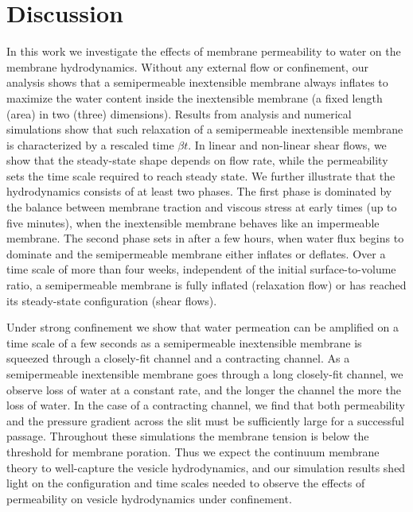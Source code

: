 \documentclass[prb,preprint,showpacs,preprintnumbers,amsmath,amssymb,longbibliography]{revtex4-1}
\begin{document}
\section{Discussion}
In this work we investigate the effects of membrane permeability to
water on the membrane hydrodynamics. Without any external flow or
confinement, our analysis shows that a semipermeable inextensible
membrane always inflates to maximize the water content inside the
inextensible membrane (a fixed length (area) in two (three) dimensions).
Results from analysis and numerical simulations show that such
relaxation of a semipermeable inextensible membrane is characterized by
a rescaled time $\beta t$. In linear and non-linear shear flows, we show
that the steady-state shape depends on flow rate, while the permeability
sets the time scale required to reach steady state. We further
illustrate that the hydrodynamics consists of at least two phases. The
first phase is dominated by the balance between membrane traction and
viscous stress at early times (up to five minutes), when the
inextensible membrane behaves like an impermeable membrane. The second
phase sets in after a few hours, when water flux begins to dominate and
the semipermeable membrane either inflates or deflates. Over a time
scale of more than four weeks, independent of the initial
surface-to-volume ratio, a semipermeable membrane is fully inflated
(relaxation flow) or has reached its steady-state configuration (shear
flows).

Under strong confinement we show that water permeation can be amplified
on a time scale of a few seconds as a semipermeable inextensible
membrane is squeezed through a closely-fit channel and a contracting
channel. As a semipermeable inextensible membrane goes through a long
closely-fit channel, we observe loss of water at a constant rate, and
the longer the channel the more the loss of water. In the case of a
contracting channel, we find that both permeability and the pressure
gradient across the slit must be sufficiently large for a successful
passage. Throughout these simulations the membrane tension is below the
threshold for membrane poration. Thus we expect the continuum membrane
theory to well-capture the vesicle hydrodynamics, and our simulation
results shed light on the configuration and time scales needed to
observe the effects of permeability on vesicle hydrodynamics under
confinement. 
\end{document}
